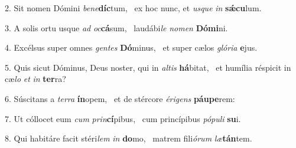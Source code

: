 2. Sit nomen Dómini \textit{be}\textit{ne}\textbf{díc}tum, \ast\  ex hoc nunc, et \textit{us}\textit{que} \textit{in} \textbf{sǽ}\textbf{cu}lum.\

3. A solis ortu usque \textit{ad} \textit{oc}\textbf{cá}sum, \ast\  laudábi\textit{le} \textit{no}\textit{men} \textbf{Dó}\textbf{mi}ni.\

4. Excélsus super omnes \textit{gen}\textit{tes} \textbf{Dó}minus, \ast\  et super cælos \textit{gló}\textit{ri}\textit{a} \textbf{e}jus.\

5. Quis sicut Dóminus, Deus noster, qui in \textit{al}\textit{tis} \textbf{há}bitat, \ast\  et humília réspicit in cæ\textit{lo} \textit{et} \textit{in} \textbf{ter}ra?\

6. Súscitans a \textit{ter}\textit{ra} \textbf{ín}opem, \ast\  et de stércore \textit{é}\textit{ri}\textit{gens} \textbf{páu}\textbf{pe}rem:\

7. Ut cóllocet eum \textit{cum} \textit{prin}\textbf{cí}pibus, \ast\  cum princípibus \textit{pó}\textit{pu}\textit{li} \textbf{su}i.\

8. Qui habitáre facit stéri\textit{lem} \textit{in} \textbf{do}mo, \ast\  matrem fili\textit{ó}\textit{rum} \textit{læ}\textbf{tán}tem.\


